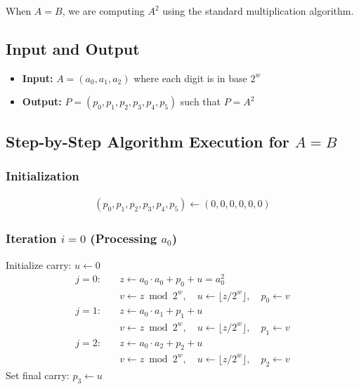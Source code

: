 \documentclass{article}
\begin{document}
When $A = B$, we are computing $A^2$ using the standard multiplication algorithm.

\subsection{Input and Output}
\begin{itemize}
    \item \textbf{Input:} $A = (a_0, a_1, a_2)$ where each digit is in base $2^w$
    \item \textbf{Output:} $P = (p_0, p_1, p_2, p_3, p_4, p_5)$ such that $P = A^2$
\end{itemize}

\subsection{Step-by-Step Algorithm Execution for $A = B$}

\subsubsection*{Initialization}
\begin{align*}
(p_0, p_1, p_2, p_3, p_4, p_5) \leftarrow (0, 0, 0, 0, 0, 0)
\end{align*}

\subsubsection*{Iteration $i = 0$ (Processing $a_0$)}
Initialize carry: $u \leftarrow 0$
\begin{align*}
j = 0: \quad & z \leftarrow a_0 \cdot a_0 + p_0 + u = a_0^2 \\
& v \leftarrow z \bmod 2^w, \quad u \leftarrow \lfloor z/2^w \rfloor, \quad p_0 \leftarrow v \\[0.5em]
j = 1: \quad & z \leftarrow a_0 \cdot a_1 + p_1 + u \\
& v \leftarrow z \bmod 2^w, \quad u \leftarrow \lfloor z/2^w \rfloor, \quad p_1 \leftarrow v \\[0.5em]
j = 2: \quad & z \leftarrow a_0 \cdot a_2 + p_2 + u \\
& v \leftarrow z \bmod 2^w, \quad u \leftarrow \lfloor z/2^w \rfloor, \quad p_2 \leftarrow v
\end{align*}
Set final carry: $p_3 \leftarrow u$
\end{document}
